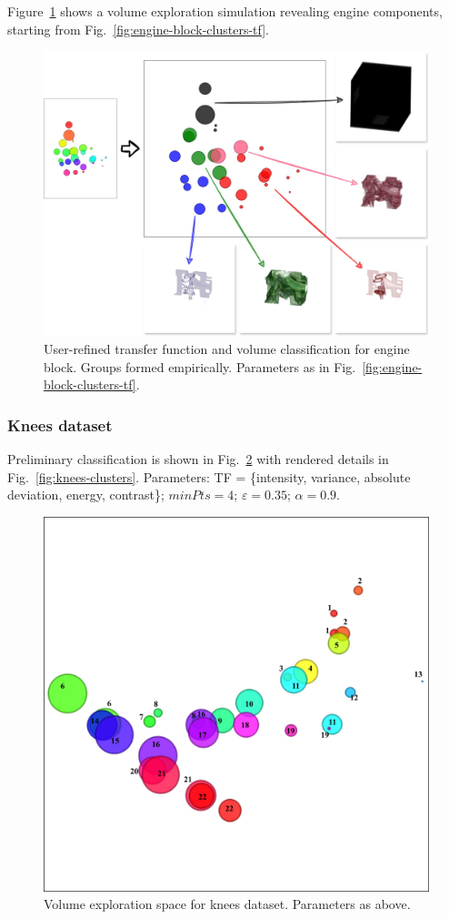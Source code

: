 Figure~\ref{fig:engine-block-groups} shows a volume exploration simulation revealing engine components, starting from Fig.~\ref{fig:engine-block-clusters-tf}.

\begin{figure}[htb!]
    \centering
    \includegraphics[width=\columnwidth]{figs/engine-block-groups.jpg}
    \caption{User-refined transfer function and volume classification for engine block. Groups formed empirically. Parameters as in Fig.~\ref{fig:engine-block-clusters-tf}.}
    \label{fig:engine-block-groups}
\end{figure}

\subsubsection{Knees dataset}
\label{subsubsect:knees-dataset}

Preliminary classification is shown in Fig.~\ref{fig:knees-tf-clusters} with rendered details in Fig.~\ref{fig:knees-clusters}. Parameters: TF = \{intensity, variance, absolute deviation, energy, contrast\}; $minPts=4$; $\varepsilon=0.35$; $\alpha=0.9$.

\begin{figure}[htb!]
    \centering
    \includegraphics[width=0.7\columnwidth]{figs/knees-clusters-tf.jpg} 
    \caption{Volume exploration space for knees dataset. Parameters as above.}
    \label{fig:knees-tf-clusters}
\end{figure}

